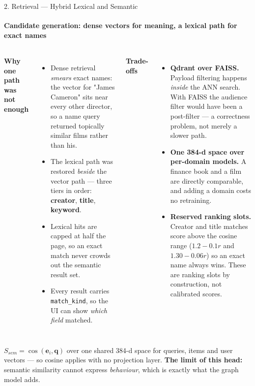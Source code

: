 \documentclass[aspectratio=169, 11pt]{beamer}
\newcommand{\eqs}{%
  \setlength{\abovedisplayskip}{3pt}%
  \setlength{\belowdisplayskip}{3pt}%
  \setlength{\abovedisplayshortskip}{2pt}%
  \setlength{\belowdisplayshortskip}{2pt}}
\newcommand{\blk}[1]{{\scriptsize\eqs\textbf{#1}}\par\vspace{0.9mm}}
\begin{document}
\begin{frame}[shrink]{2. Retrieval --- Hybrid Lexical and Semantic}
\framesubtitle{Candidate generation: dense vectors for meaning, a lexical path for exact names}
\vspace{2mm}
\begin{columns}[T]
\blk{Why one path was not enough}
\begin{itemize}\scriptsize\setlength{\itemsep}{4pt}
  \item Dense retrieval \emph{smears} exact names: the vector for "James Cameron" sits near every
        other director, so a name query returned topically similar films rather than his.
  \item The lexical path was restored \emph{beside} the vector path --- three tiers in order:
        \textbf{creator}, \textbf{title}, \textbf{keyword}.
  \item Lexical hits are capped at half the page, so an exact match never crowds out the semantic
        result set.
  \item Every result carries \texttt{match\_kind}, so the UI can show
        \emph{which field} matched.
\end{itemize}

\blk{Trade-offs}
\begin{itemize}\scriptsize\setlength{\itemsep}{4pt}
  \item \textbf{Qdrant over FAISS.} Payload filtering happens \emph{inside} the ANN search. With
        FAISS the audience filter would have been a post-filter --- a correctness problem, not
        merely a slower path.
  \item \textbf{One 384-d space over per-domain models.} A finance book and a film are directly
        comparable, and adding a domain costs no retraining.
  \item \textbf{Reserved ranking slots.} Creator and title matches score above the cosine range
        ($1.2-0.1r$ and $1.30-0.06r$) so an exact name always wins. These are ranking slots by
        construction, not calibrated scores.
\end{itemize}
\end{columns}
\vfill
{\footnotesize $S_{\mathit{sem}} = \cos(\mathbf{e}_i, \mathbf{q})$ over one shared 384-d space for
queries, items and user vectors --- so cosine applies with no projection layer. \textbf{The limit of
this head:} semantic similarity cannot express \emph{behaviour}, which is exactly what the graph
model adds.}
\vfill
\end{frame}
\end{document}
